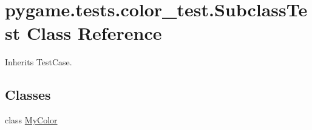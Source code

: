 \hypertarget{classpygame_1_1tests_1_1color__test_1_1_subclass_test}{}\section{pygame.\+tests.\+color\+\_\+test.\+Subclass\+Test Class Reference}
\label{classpygame_1_1tests_1_1color__test_1_1_subclass_test}


Inherits Test\+Case.

\subsection*{Classes}
\begin{DoxyCompactItemize}
\item 
class \hyperlink{classpygame_1_1tests_1_1color__test_1_1_subclass_test_1_1_my_color}{My\+Color}
\end{DoxyCompactItemize}

